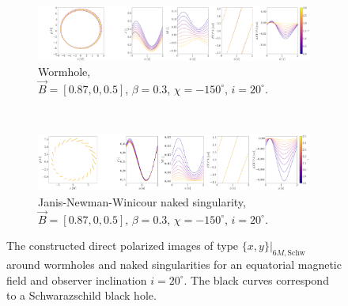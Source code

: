\documentclass[12pt]{article}
\numberwithin{equation}{section}
\numberwithin{figure}{section}
\begin{document}
	\begin{figure}[!htb]
		\begin{subfigure}{16cm}
			\hspace{-1.0em}
			\includegraphics[scale = 0.15]{Section_7_Polarized_Emission/WH_delta_fig_B_0.87_0.5_0_20_deg_r6.png}
			\caption{Wormhole,\\ $\vec{B} = [0.87, 0, 0.5]$, $\beta = 0.3$, $\chi = -150^\circ$, $i = 20^\circ$.} 
		\end{subfigure}\\
		\begin{subfigure}{17cm}
			\hspace{-0.2em}
			\includegraphics[scale = 0.15]{Section_7_Polarized_Emission/JNW_delta_figs_B_0.87_0.0_0.5_20_deg_direct.png}
			\caption{Janis-Newman-Winicour naked singularity,\\  $\vec{B} = [0.87, 0, 0.5]$, $\beta = 0.3$, $\chi = -150^\circ$, $i = 20^\circ$.}
		\end{subfigure}
		\caption[The polarized direct images around wormholes and naked singularities for an equatorial magnetic field at $i = 20^\circ$.]{\small The constructed direct polarized images of type $\{x,y\}\vert_{6M, \text{Schw}}$ around wormholes and naked singularities for an equatorial magnetic field and observer inclination $i = 20^\circ$. The black curves correspond to a Schwarazschild black hole.} 
		\label{Direct_image_deltas_20}
	\end{figure}
	
\end{document}

